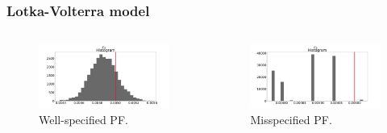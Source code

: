 \documentclass{beamer}
\begin{document}
    \begin{frame}
    \frametitle{Lotka-Volterra model}
    \begin{columns}
        \begin{column}{0.45\textwidth}
            \begin{figure}
                \centering
                \includegraphics[width=\columnwidth]{images/lv_pf_g}
                \caption{Well-specified PF.}
            \end{figure}
        \end{column}
%
        \begin{column}{0.45\textwidth}
            \begin{figure}
                \centering
                \includegraphics[width=\columnwidth]{images/lv_pf_c}
                \caption{Misspecified PF.}
            \end{figure}
        \end{column}
    \end{columns}


\end{frame}
\end{document}
